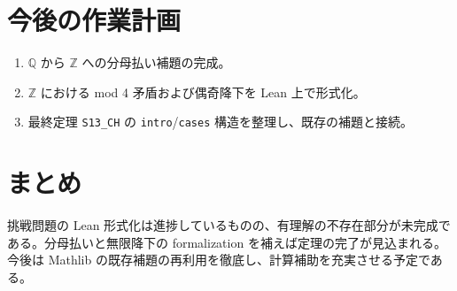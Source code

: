 \documentclass{ltjsarticle}
\begin{document}
\section{今後の作業計画}
\begin{enumerate}
  \item \(\mathbb{Q}\) から \(\mathbb{Z}\) への分母払い補題の完成。
  \item \(\mathbb{Z}\) における mod 4 矛盾および偶奇降下を Lean 上で形式化。
  \item 最終定理 \texttt{S13\_CH} の \texttt{intro}/\texttt{cases} 構造を整理し、既存の補題と接続。
\end{enumerate}

\section{まとめ}
挑戦問題の Lean 形式化は進捗しているものの、有理解の不存在部分が未完成である。分母払いと無限降下の formalization を補えば定理の完了が見込まれる。今後は Mathlib の既存補題の再利用を徹底し、計算補助を充実させる予定である。
\end{document}
